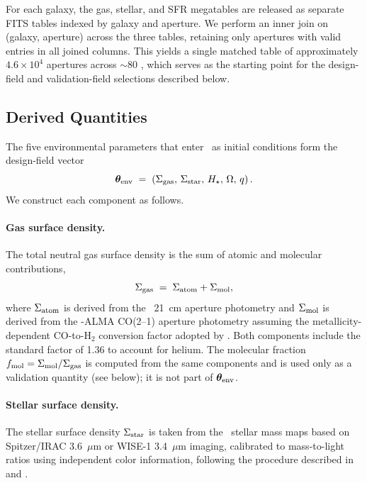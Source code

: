 For each galaxy, the gas, stellar, and SFR megatables are released as
separate FITS tables indexed by galaxy and aperture. We perform an inner
join on (galaxy, aperture) across the three tables, retaining only
apertures with valid entries in all joined columns. This yields a single
matched table of approximately $4.6\times10^{4}$ apertures across
$\sim80$ , which serves as the starting point for the design-field and
validation-field selections described below.

\subsection{Derived Quantities}
\label{sec:derived}

The five environmental parameters that enter \TIGRESS\ as initial
conditions form the design-field vector
\begin{equation}
  \boldsymbol{\theta}_{\rm env} \;=\; \left(\Sigma_{\rm gas},\, \Sigma_{\rm star},\, H_\star,\, \Omega,\, q\right).
  \label{eq:thetaenv}
\end{equation}
We construct each component as follows.

\paragraph{Gas surface density.}
The total neutral gas surface density is the sum of atomic and molecular
contributions,
\begin{equation}
  \Sigma_{\rm gas} \;=\; \Sigma_{\rm atom} + \Sigma_{\rm mol},
\end{equation}
where $\Sigma_{\rm atom}$ is derived from the \HI\ 21~cm aperture photometry and
$\Sigma_{\rm mol}$ is derived from the \PHANGS-ALMA CO(2--1) aperture photometry
assuming the metallicity-dependent CO-to-H$_2$ conversion factor adopted
by \citet{2022AJ....164...43S}. Both components include the standard
factor of 1.36 to account for helium. The molecular fraction
$f_{\rm mol} = \Sigma_{\rm mol}/\Sigma_{\rm gas}$ is computed from the same components and is used
only as a validation quantity (see below); it is not part of $\boldsymbol{\theta}_{\rm env}$.

\paragraph{Stellar surface density.}
The stellar surface density $\Sigma_{\rm star}$ is taken from the \PHANGS\ stellar
mass maps based on Spitzer/IRAC 3.6~$\mu$m or WISE-1 3.4~$\mu$m imaging,
calibrated to mass-to-light ratios using independent color information,
following the procedure described in \citet{2021ApJS..255...19L} and
\citet{2025ApJ...989...66V}.

